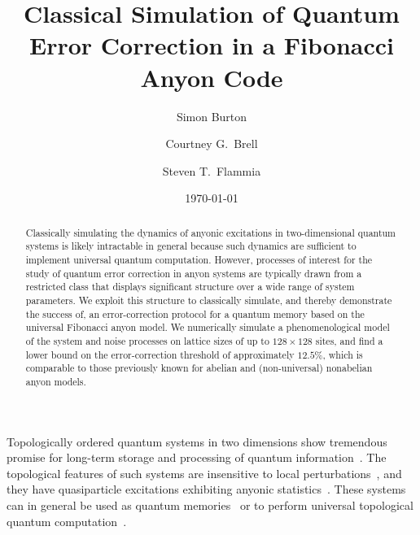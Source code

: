 \documentclass[aps, prl, letterpaper, twocolumn, superscriptaddress, notitlepage, 10pt]{revtex4-1}
\begin{document}
\title{Classical Simulation of Quantum Error Correction in a Fibonacci Anyon Code}

\author{Simon Burton}
\author{Courtney G.\ Brell}
\author{Steven T.\ Flammia}

\date{\today}

\begin{abstract}
Classically simulating the dynamics of anyonic excitations in two-dimensional quantum systems is likely intractable in general because such dynamics are sufficient to implement 
universal quantum computation. However, processes of interest for the study of quantum 
error correction in anyon systems are typically drawn from a restricted class that displays 
significant structure over a wide range of system parameters.
We exploit this structure to classically simulate, and thereby demonstrate the success of, an 
error-correction protocol for a quantum memory based on the universal Fibonacci anyon 
model.  We numerically simulate a phenomenological model of the system and noise 
processes on lattice sizes of up to 
$128\times128$ sites, and find a lower bound on the error-correction threshold of 
approximately $12.5\%$, which is comparable to those previously known for abelian and 
(non-universal) nonabelian anyon models.
\end{abstract}

\maketitle


Topologically ordered quantum systems in two dimensions show tremendous promise for 
long-term storage and processing of quantum information~\cite{Kitaev2003, Dennis2002, Nayak2008}. 
The topological features of such systems are insensitive to local 
perturbations~\cite{Bravyi2010, Bravyi2011a, Michalakis2013}, and they have quasiparticle excitations 
exhibiting anyonic statistics~\cite{Wilczek1990}. These systems can in general be used as 
quantum memories~\cite{Kitaev2003, Dennis2002} or to perform universal topological 
quantum computation~\cite{Freedman2002, Nayak2008}.
\end{document}
